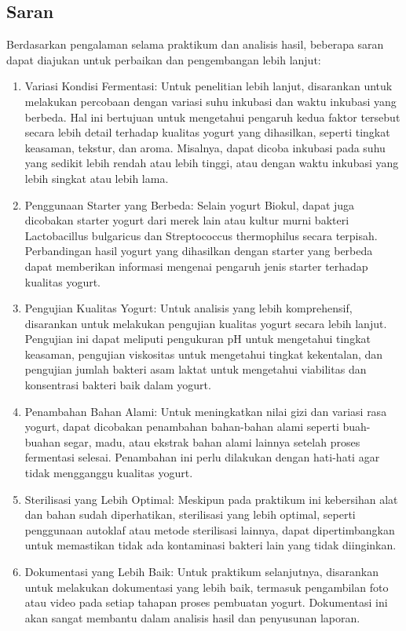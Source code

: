\documentclass[a4paper,12pt, left=3cm,right=2cm,bottom=2cm, bahasa]{article}
\begin{document}
\subsection{Saran}
Berdasarkan pengalaman selama praktikum dan analisis hasil, beberapa saran dapat diajukan untuk perbaikan dan pengembangan lebih lanjut:
\begin{enumerate}
  \item Variasi Kondisi Fermentasi:  Untuk penelitian lebih lanjut, disarankan untuk melakukan percobaan dengan variasi suhu inkubasi dan waktu inkubasi yang berbeda. Hal ini bertujuan untuk mengetahui pengaruh kedua faktor tersebut secara lebih detail terhadap kualitas yogurt yang dihasilkan, seperti tingkat keasaman, tekstur, dan aroma.  Misalnya, dapat dicoba inkubasi pada suhu yang sedikit lebih rendah atau lebih tinggi, atau dengan waktu inkubasi yang lebih singkat atau lebih lama. 
  \item Penggunaan Starter yang Berbeda:  Selain yogurt Biokul, dapat juga dicobakan starter yogurt dari merek lain atau kultur murni bakteri Lactobacillus bulgaricus dan Streptococcus thermophilus secara terpisah.  Perbandingan hasil yogurt yang dihasilkan dengan starter yang berbeda dapat memberikan informasi mengenai pengaruh jenis starter terhadap kualitas yogurt. 
  \item Pengujian Kualitas Yogurt:  Untuk analisis yang lebih komprehensif, disarankan untuk melakukan pengujian kualitas yogurt secara lebih lanjut.  Pengujian ini dapat meliputi pengukuran pH untuk mengetahui tingkat keasaman, pengujian viskositas untuk mengetahui tingkat kekentalan, dan pengujian jumlah bakteri asam laktat untuk mengetahui viabilitas dan konsentrasi bakteri baik dalam yogurt.
  \item Penambahan Bahan Alami:  Untuk meningkatkan nilai gizi dan variasi rasa yogurt, dapat dicobakan penambahan bahan-bahan alami seperti buah-buahan segar, madu, atau ekstrak bahan alami lainnya setelah proses fermentasi selesai.  Penambahan ini perlu dilakukan dengan hati-hati agar tidak mengganggu kualitas yogurt.
  \item Sterilisasi yang Lebih Optimal:  Meskipun pada praktikum ini kebersihan alat dan bahan sudah diperhatikan, sterilisasi yang lebih optimal, seperti penggunaan autoklaf atau metode sterilisasi lainnya, dapat dipertimbangkan untuk memastikan tidak ada kontaminasi bakteri lain yang tidak diinginkan.
  \item Dokumentasi yang Lebih Baik:  Untuk praktikum selanjutnya, disarankan untuk melakukan dokumentasi yang lebih baik, termasuk pengambilan foto atau video pada setiap tahapan proses pembuatan yogurt. Dokumentasi ini akan sangat membantu dalam analisis hasil dan penyusunan laporan.
\end{enumerate}
\end{document}
